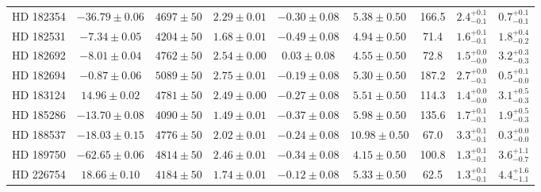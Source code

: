 \begin{table*}
\begin{tabular}{ccccccccc}
HD 182354 & $-36.79 \pm 0.06$ & $4697 \pm 50$ & $2.29 \pm 0.01$ & $-0.30 \pm 0.08$ & $5.38 \pm 0.50$ & 166.5 & $2.4^{+0.1}_{-0.1}$ & $0.7^{+0.1}_{-0.1}$ \\
HD 182531 & $-7.34 \pm 0.05$ & $4204 \pm 50$ & $1.68 \pm 0.01$ & $-0.49 \pm 0.08$ & $4.94 \pm 0.50$ & 71.4 & $1.6^{+0.1}_{-0.1}$ & $1.8^{+0.4}_{-0.2}$ \\
HD 182692 & $-8.01 \pm 0.04$ & $4762 \pm 50$ & $2.54 \pm 0.00$ & $0.03 \pm 0.08$ & $4.55 \pm 0.50$ & 72.8 & $1.5^{+0.0}_{-0.0}$ & $3.2^{+0.3}_{-0.3}$ \\
HD 182694 & $-0.87 \pm 0.06$ & $5089 \pm 50$ & $2.75 \pm 0.01$ & $-0.19 \pm 0.08$ & $5.30 \pm 0.50$ & 187.2 & $2.7^{+0.0}_{-0.1}$ & $0.5^{+0.1}_{-0.0}$ \\
HD 183124 & $14.96 \pm 0.02$ & $4781 \pm 50$ & $2.49 \pm 0.00$ & $-0.27 \pm 0.08$ & $5.51 \pm 0.50$ & 114.3 & $1.4^{+0.0}_{-0.0}$ & $3.1^{+0.5}_{-0.3}$ \\
HD 185286 & $-13.70 \pm 0.08$ & $4090 \pm 50$ & $1.49 \pm 0.01$ & $-0.37 \pm 0.08$ & $5.98 \pm 0.50$ & 135.6 & $1.7^{+0.1}_{-0.1}$ & $1.9^{+0.5}_{-0.3}$ \\
HD 188537 & $-18.03 \pm 0.15$ & $4776 \pm 50$ & $2.02 \pm 0.01$ & $-0.24 \pm 0.08$ & $10.98 \pm 0.50$ & 67.0 & $3.3^{+0.1}_{-0.1}$ & $0.3^{+0.0}_{-0.0}$ \\
HD 189750 & $-62.65 \pm 0.06$ & $4814 \pm 50$ & $2.46 \pm 0.01$ & $-0.34 \pm 0.08$ & $4.15 \pm 0.50$ & 100.8 & $1.3^{+0.1}_{-0.1}$ & $3.6^{+1.1}_{-0.7}$ \\
HD 226754 & $18.66 \pm 0.10$ & $4184 \pm 50$ & $1.74 \pm 0.01$ & $-0.12 \pm 0.08$ & $5.33 \pm 0.50$ & 62.5 & $1.3^{+0.1}_{-0.1}$ & $4.4^{+1.6}_{-1.1}$ \\
\hline
\end{tabular}
\end{table*}
